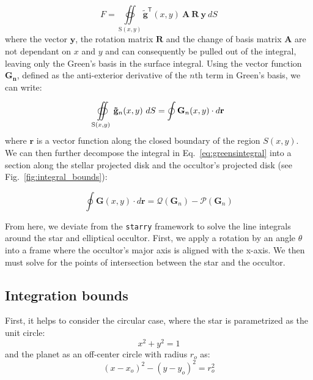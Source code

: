 \documentclass[twocolumn]{aastex631}
\begin{document}
\begin{equation}
   F = \oiint\limits_{\mathrm{S}(x,y)} \mathbf{\tilde{g}}^\mathsf{T}(x,y) \ \mathbf{A}\ \mathbf{R}\ \mathbf{y}\ dS 
\end{equation}
where the vector $\mathbf{y}$, the rotation matrix $\mathbf{R}$ and the change of basis matrix $\mathbf{A}$ are not dependant on $x$ and $y$ and can consequently be pulled out of the integral, leaving only the Green's basis in the surface integral. Using the vector function $\mathbf{G_n}$, defined as the anti-exterior derivative of the $n$th term in Green's basis, we can write:

\begin{equation} \label{eq:greensintegral}
   \oiint\limits_{\mathrm{S}(x,y)} \mathbf{\tilde{g}}_n(x,y)\ dS \\
   = \oint \mathbf{G}_n(x,y) \cdot d\mathbf{r}
\end{equation}
where $\mathbf{r}$ is a vector function along the closed boundary of the region $S(x,y)$. We can then further decompose the integral in Eq.~\ref{eq:greensintegral} into a section along the stellar projected disk and the occultor's projected disk (see Fig.~\ref{fig:integral_bounds}):

\begin{equation} \label{eq:pandq}
    \oint \mathbf{G}(x,y) \cdot d\mathbf{r} = \mathcal{Q}(\mathbf{G}_n) - \mathcal{P}(\mathbf{G}_n)
\end{equation}

From here, we deviate from the \texttt{starry} framework to solve the line integrals around the star and elliptical occultor. First, we apply a rotation by an angle $\theta$ into a frame where the occultor's major axis is aligned with the x-axis. We then must solve for the points of intersection between the star and the occultor. 

\subsection{Integration bounds}
First, it helps to consider the circular case, where the star is parametrized as the unit circle:
\begin{equation} \label{eq:unitcircle}
x^2 + y^2 = 1
\end{equation}
and the planet as an off-center circle with radius $r_{o}$ as:
\begin{equation} \label{eq:circularplanet}
(x-x_o)^2-(y-y_o)^2 = r_o^2
\end{equation}
\end{document}
